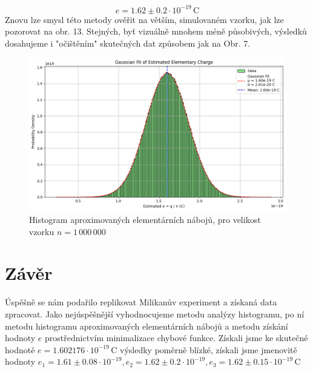 \documentclass[czech,11pt,a4paper]{article}
\begin{document}
\begin{multicols}{2}
\begin{figure}[H]
	 	\end{figure}
	 	\begin{equation*}
	 		e = 1.62 \pm 0.2 \cdot 10^{-19} \, \mathrm{C}
	 	\end{equation*}
	 	Znovu lze smysl této metody ověřit na větším, simulovaném vzorku, jak lze pozorovat na obr. 13. Stejných, byť vizuálně mnohem méně působivých, výsledků dosahujeme i "očištěním" skutečných dat způsobem jak na Obr. 7. 
	 	\begin{figure}[H]
	 		\centering
	 		\includegraphics[width=0.8\linewidth]{gauss2}
	 		\caption{Histogram aproximovaných elementárních nábojů, pro velikost vzorku $n = 1\, 000\,000 $}
	 		
	 	\end{figure}
		
		
		\section{Závěr}
		Úspěšně se nám podařilo replikovat Milikanův experiment a získaná data zpracovat. Jako nejúspěšnější vyhodnocujeme metodu analýzy histogramu, po ní metodu histogramu aproximovaných elementárních nábojů a metodu získání hodnoty $e$ prostřednictvím minimalizace chybové funkce. Získali jsme ke skutečné hodnotě $e = 1.602176 \cdot 10^{-19}\,\mathrm{C}$\cite{NIST} výsledky poměrně blízké, získali jsme jmenovitě hodnoty $e_1 = 1.61\pm 0.08 \cdot 10^{-19}, e_2 = 1.62\pm 0.2 \cdot 10^{-19}, e_3 = 1.62 \pm 0.15 \cdot 10^{-19} \,\mathrm{C}  $
		
\printbibliography

			\end{multicols}
		
		
\end{document}
